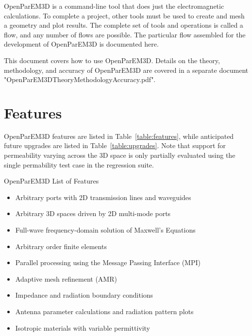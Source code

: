 \documentclass[titlepage]{article}
\renewcommand\_{\textunderscore\linebreak[1]}
\begin{document}
OpenParEM3D is a command-line tool that does just the electromagnetic calculations.  To complete a project, other tools must be used to create and mesh a geometry and plot results.  The complete set of tools and operations is called a flow, and any number of flows are possible.  The particular flow assembled for the development of OpenParEM3D is documented here.

This document covers how to use OpenParEM3D.  Details on the theory, methodology, and accuracy of OpenParEM3D are covered in a separate document "OpenParEM3D\_Theory\_Methodology\_Accuracy.pdf".

\section{Features}

OpenParEM3D features are listed in Table~\ref{table:features}, while anticipated future upgrades are listed in Table~\ref{table:upgrades}. Note that support for permeability varying across the 3D space is only partially evaluated using the single permability test case in the regression suite.

\begin{table}[ht]
\caption{OpenParEM3D List of Features}
\noindent \hrulefill
\begin{itemize}[nosep]
  \item Arbitrary ports with 2D transmission lines and waveguides
  \item Arbitrary 3D spaces driven by 2D multi-mode ports
  \item Full-wave frequency-domain solution of Maxwell's Equations
  \item Arbitrary order finite elements
  \item Parallel processing using the Message Passing Interface (MPI)
  \item Adaptive mesh refinement (AMR)
  \item Impedance and radiation boundary conditions
  \item Antenna parameter calculations and radiation pattern plots
  \item Isotropic materials with variable permittivity
\end{itemize}
\noindent \hrulefill
\label{table:features}
\end{table}
\end{document}
